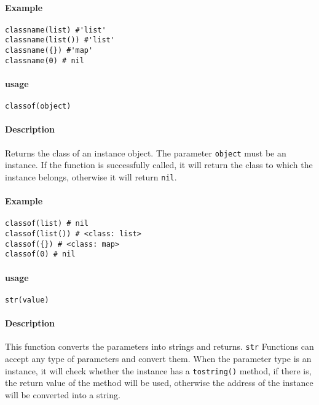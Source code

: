 \paragraph{Example}
\begin{lstlisting}[language=berry, numbers=none]
classname(list) #'list'
classname(list()) #'list'
classname({}) #'map'
classname(0) # nil
\end{lstlisting}


\paragraph{usage}
\begin{lstlisting}[language=berry, numbers=none]
classof(object)
\end{lstlisting}

\paragraph{Description}
Returns the class of an instance object. The parameter \texttt{object} must be an instance. If the function is successfully called, it will return the class to which the instance belongs, otherwise it will return \texttt{nil}.

\paragraph{Example}
\begin{lstlisting}[language=berry, numbers=none]
classof(list) # nil
classof(list()) # <class: list>
classof({}) # <class: map>
classof(0) # nil
\end{lstlisting}

\paragraph{usage}
\begin{lstlisting}[language=berry, numbers=none]
str(value)
\end{lstlisting}

\paragraph{Description}
This function converts the parameters into strings and returns. \texttt{str} Functions can accept any type of parameters and convert them. When the parameter type is an instance, it will check whether the instance has a \texttt{tostring()} method, if there is, the return value of the method will be used, otherwise the address of the instance will be converted into a string.

